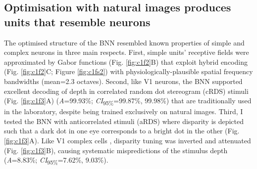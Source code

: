 {\subsection{Optimisation with natural images produces units that resemble neurons}

The optimised structure of the BNN resembled known properties of simple and complex neurons in three main respects. First, simple units' receptive fields were approximated by Gabor functions (Fig. \ref{fig:c1f2}B) that exploit hybrid encoding (Fig. \ref{fig:c1f2}C; Figure \ref{fig:c1fs2}) \cite{DeAngelis:1991mb, Prince:2002uq, Tsao:2003pi} with physiologically-plausible spatial frequency bandwidths (mean=2.3 octaves). Second, like V1 neurons, the BNN supported excellent decoding of depth in correlated random dot stereogram (cRDS) stimuli (Fig. \ref{fig:c1f3}A) ({\it A}=99.93\%; {\it CI}\textsubscript{95\%}=99.87\%, 99.98\%) that are traditionally used in the laboratory, despite being trained exclusively on natural images. Third, I tested the BNN with anticorrelated stimuli (aRDS) where disparity is depicted such that a dark dot in one eye corresponds to a bright dot in the other (Fig. \ref{fig:c1f3}A). Like V1 complex cells \cite{Ohzawa:1990cq,Cumming:1997ve, Samonds:2013cs}, disparity tuning was inverted and attenuated (Fig. \ref{fig:c1f3}B), causing systematic mispredictions of the stimulus depth ({\it A}=8.83\%; {\it CI}\textsubscript{95\%}=7.62\%, 9.03\%). 

}
